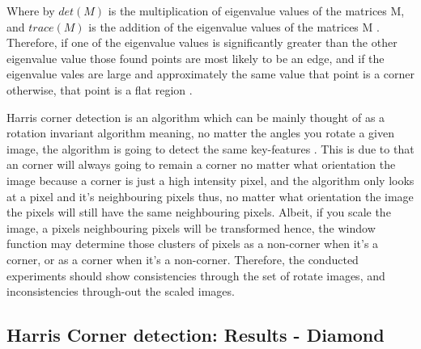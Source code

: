 \documentclass[conference]{IEEEtran}
\begin{document}
Where by $det(M)$ is the multiplication of eigenvalue values of the matrices M, and $trace(M)$ is the addition of the eigenvalue values of the matrices M \cite{b2}. Therefore, if one of the eigenvalue values is significantly greater than the other eigenvalue value those found points are most likely to be an edge, and if the eigenvalue vales are large and approximately the same value that point is a corner otherwise, that point is a flat region \cite{b2}.\par

Harris corner detection is an algorithm which can be mainly thought of as a rotation invariant algorithm meaning, no matter the angles you rotate a given image, the algorithm is going to detect the same key-features \cite{b2} \cite{b4}. This is due to that an corner will always going to remain a corner no matter what orientation the image because a corner is just a high intensity pixel, and the algorithm only looks at a pixel and it's neighbouring pixels thus, no matter what orientation the image the pixels will still have the same neighbouring pixels\cite{b2}. Albeit, if you scale the image, a pixels neighbouring pixels will be transformed hence, the window function may determine those clusters of pixels as a non-corner when it's a corner, or as a corner when it's a non-corner. Therefore, the conducted experiments should show consistencies through the set of rotate images, and inconsistencies through-out the scaled images.

\newpage
\clearpage
\subsection{Harris Corner detection: Results - Diamond}\label{one-results}
\end{document}
